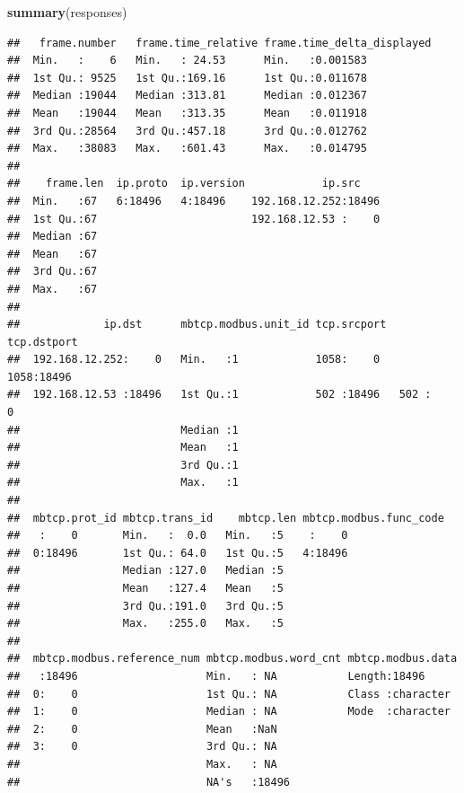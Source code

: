 \documentclass[]{article}
\newenvironment{Shaded}{\begin{snugshade}}{\end{snugshade}}
\newcommand{\KeywordTok}[1]{\textcolor[rgb]{0.13,0.29,0.53}{\textbf{{#1}}}}
\newcommand{\NormalTok}[1]{{#1}}
\begin{document}
\begin{Shaded}
\begin{Highlighting}[]
\KeywordTok{summary}\NormalTok{(responses)}
\end{Highlighting}
\end{Shaded}

\begin{verbatim}
##   frame.number   frame.time_relative frame.time_delta_displayed
##  Min.   :    6   Min.   : 24.53      Min.   :0.001583          
##  1st Qu.: 9525   1st Qu.:169.16      1st Qu.:0.011678          
##  Median :19044   Median :313.81      Median :0.012367          
##  Mean   :19044   Mean   :313.35      Mean   :0.011918          
##  3rd Qu.:28564   3rd Qu.:457.18      3rd Qu.:0.012762          
##  Max.   :38083   Max.   :601.43      Max.   :0.014795          
##                                                                
##    frame.len  ip.proto  ip.version            ip.src     
##  Min.   :67   6:18496   4:18496    192.168.12.252:18496  
##  1st Qu.:67                        192.168.12.53 :    0  
##  Median :67                                              
##  Mean   :67                                              
##  3rd Qu.:67                                              
##  Max.   :67                                              
##                                                          
##             ip.dst      mbtcp.modbus.unit_id tcp.srcport  tcp.dstport 
##  192.168.12.252:    0   Min.   :1            1058:    0   1058:18496  
##  192.168.12.53 :18496   1st Qu.:1            502 :18496   502 :    0  
##                         Median :1                                     
##                         Mean   :1                                     
##                         3rd Qu.:1                                     
##                         Max.   :1                                     
##                                                                       
##  mbtcp.prot_id mbtcp.trans_id    mbtcp.len mbtcp.modbus.func_code
##   :    0       Min.   :  0.0   Min.   :5    :    0               
##  0:18496       1st Qu.: 64.0   1st Qu.:5   4:18496               
##                Median :127.0   Median :5                         
##                Mean   :127.4   Mean   :5                         
##                3rd Qu.:191.0   3rd Qu.:5                         
##                Max.   :255.0   Max.   :5                         
##                                                                  
##  mbtcp.modbus.reference_num mbtcp.modbus.word_cnt mbtcp.modbus.data 
##   :18496                    Min.   : NA           Length:18496      
##  0:    0                    1st Qu.: NA           Class :character  
##  1:    0                    Median : NA           Mode  :character  
##  2:    0                    Mean   :NaN                             
##  3:    0                    3rd Qu.: NA                             
##                             Max.   : NA                             
##                             NA's   :18496
\end{verbatim}
\end{document}
